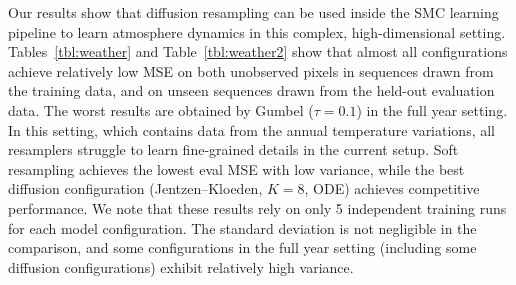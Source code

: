 \documentclass{article}
\begin{document}
\begin{table}
  \caption{Prediction quality in terms of MSE ($\times 10^{-3}$, lower is better) for the weather forecasting experiment in the single-sequence setting.
  Results are presented as mean $\pm$ standard deviation over 5 independent runs recorded after 3000 training iterations.
  Train MSE is averaged over all 7 training years; eval MSE is computed on the January sequence from the held-out year.}
  \label{tbl:weather2}
  \centering
\end{table}

Our results show that diffusion resampling can be used inside the SMC learning pipeline to learn atmosphere dynamics in this complex, high-dimensional setting. Tables~\ref{tbl:weather} and Table~\ref{tbl:weather2} show that almost all configurations achieve relatively low MSE on both unobserved pixels in sequences drawn from the training data, and on unseen sequences drawn from the held-out evaluation data. The worst results are obtained by Gumbel ($\tau=0.1$) in the full year setting.
In this setting, which contains data from the annual temperature variations, all resamplers struggle to learn fine-grained details in the current setup. Soft resampling achieves the lowest eval MSE with low variance, while the best diffusion configuration (Jentzen--Kloeden, $K=8$, ODE) achieves competitive performance. We note that these results rely on only 5 independent training runs for each model configuration. The standard deviation is not negligible in the comparison, and some configurations in the full year setting (including some diffusion configurations) exhibit relatively high variance.
\end{document}
